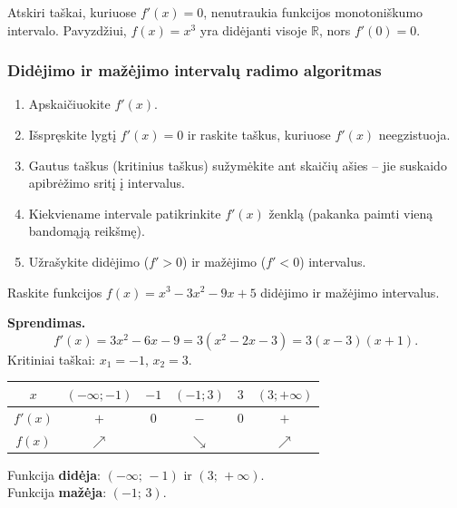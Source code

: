 \begin{remark}
Atskiri taškai, kuriuose $f'(x) = 0$, nenutraukia funkcijos monotoniškumo
intervalo. Pavyzdžiui, $f(x) = x^3$ yra didėjanti visoje $\mathbb{R}$,
nors $f'(0) = 0$.
\end{remark}

\subsubsection*{Didėjimo ir mažėjimo intervalų radimo algoritmas}

\begin{enumerate}
  \item Apskaičiuokite $f'(x)$.
  \item Išspręskite lygtį $f'(x) = 0$ ir raskite taškus, kuriuose $f'(x)$
        neegzistuoja.
  \item Gautus taškus (kritinius taškus) sužymėkite ant skaičių ašies --
        jie suskaido apibrėžimo sritį į intervalus.
  \item Kiekviename intervale patikrinkite $f'(x)$ ženklą (pakanka paimti
        vieną bandomąją reikšmę).
  \item Užrašykite didėjimo ($f'>0$) ir mažėjimo ($f'<0$) intervalus.
\end{enumerate}

\begin{example}
Raskite funkcijos $f(x) = x^3 - 3x^2 - 9x + 5$ didėjimo ir mažėjimo
intervalus.

\textbf{Sprendimas.}
\[
  f'(x) = 3x^2 - 6x - 9 = 3(x^2 - 2x - 3) = 3(x-3)(x+1).
\]
Kritiniai taškai: $x_1 = -1$, $x_2 = 3$.

\medskip
\begin{center}
\begin{tabular}{c|ccccc}
  $x$     & $(-\infty;{-1})$ & $-1$ & $(-1;3)$ & $3$ & $(3;{+\infty})$ \\
  \hline
  $f'(x)$ & $+$              & $0$  & $-$      & $0$ & $+$             \\
  $f(x)$  & $\nearrow$       &      & $\searrow$&    & $\nearrow$      \\
\end{tabular}
\end{center}
\medskip

Funkcija \textbf{didėja}: $(-\infty;\,-1)$ ir $(3;\,+\infty)$.\\
Funkcija \textbf{mažėja}: $(-1;\,3)$.
\end{example}


